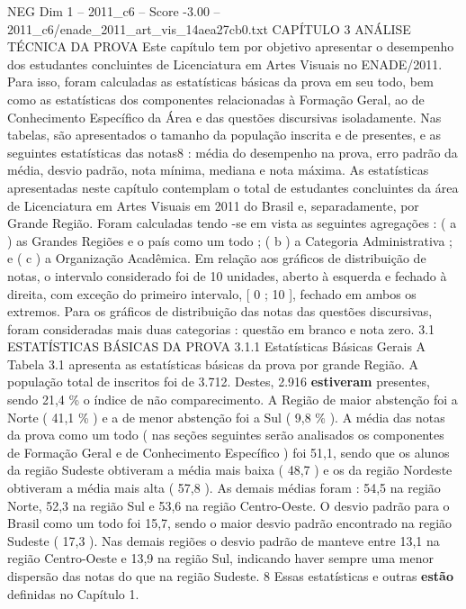 \begin{textsample}{NEG Dim 1 – 2011\_c6 – Score -3.00 – 2011\_c6/enade\_2011\_art\_vis\_14aea27cb0.txt}  \label{ex:f1_neg_228}
CAPÍTULO 3 ANÁLISE TÉCNICA DA PROVA Este capítulo tem por objetivo apresentar o desempenho dos estudantes concluintes de Licenciatura em Artes Visuais no ENADE/2011.
Para isso, foram calculadas as estatísticas básicas da prova em seu todo, bem como as estatísticas dos componentes relacionadas à Formação Geral, ao de Conhecimento Específico da Área e das questões discursivas isoladamente.
Nas tabelas, são apresentados o tamanho da população inscrita e de presentes, e as seguintes estatísticas das notas8 : média do desempenho na prova, erro padrão da média, desvio padrão, nota mínima, mediana e nota máxima.
As estatísticas apresentadas neste capítulo contemplam o total de estudantes concluintes da área de Licenciatura em Artes Visuais em 2011 do Brasil e, separadamente, por Grande Região.
Foram calculadas tendo -se em vista as seguintes agregações : ( a ) as Grandes Regiões e o país como um todo ; ( b ) a Categoria Administrativa ; e ( c ) a Organização Acadêmica.
Em relação aos gráficos de distribuição de notas, o intervalo considerado foi de 10 unidades, aberto à esquerda e fechado à direita, com exceção do primeiro intervalo, [ 0 ; 10 ], fechado em ambos os extremos.
Para os gráficos de distribuição das notas das questões discursivas, foram consideradas mais duas categorias : questão em branco e nota zero. 3.1 ESTATÍSTICAS BÁSICAS DA PROVA 3.1.1 Estatísticas Básicas Gerais A Tabela 3.1 apresenta as estatísticas básicas da prova por grande Região.
A população total de inscritos foi de 3.712.
Destes, 2.916 \textbf{estiveram} presentes, sendo 21,4 \% o índice de não comparecimento.
A Região de maior abstenção foi a Norte ( 41,1 \% ) e a de menor abstenção foi a Sul ( 9,8 \% ).
A média das notas da prova como um todo ( nas seções seguintes serão analisados os componentes de Formação Geral e de Conhecimento Específico ) foi 51,1, sendo que os alunos da região Sudeste obtiveram a média mais baixa ( 48,7 ) e os da região Nordeste obtiveram a média mais alta ( 57,8 ).
As demais médias foram : 54,5 na região Norte, 52,3 na região Sul e 53,6 na região Centro-Oeste.
O desvio padrão para o Brasil como um todo foi 15,7, sendo o maior desvio padrão encontrado na região Sudeste ( 17,3 ).
Nas demais regiões o desvio padrão de manteve entre 13,1 na região Centro-Oeste e 13,9 na região Sul, indicando haver sempre uma menor dispersão das notas do que na região Sudeste. 8 Essas estatísticas e outras \textbf{estão} definidas no Capítulo 1.

\end{textsample}
